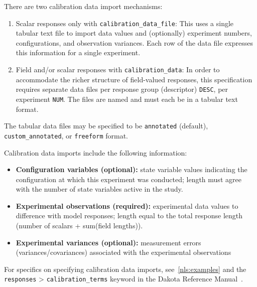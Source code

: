 There are two calibration data import mechanisms:
\begin{enumerate}
\item Scalar responses only with \texttt{calibration\_data\_file}: This
  uses a single tabular text file to import data values and
  (optionally) experiment numbers, configurations, and observation
  variances.  Each row of the data file expresses this information for
  a single experiment.

\item Field and/or scalar responses with \texttt{calibration\_data}:
  In order to accommodate the richer structure of field-valued
  responses, this specification requires separate data files per
  response group (descriptor) {\tt DESC}, per experiment {\tt NUM}.
  The files are named  and must each be in a
  tabular text format.
\end{enumerate}
The tabular data files may be specified to be {\tt annotated}
(default), {\tt custom\_annotated}, or {\tt freeform} format.

Calibration data imports include the following information:
\begin{itemize}
\item {\bf Configuration variables (optional):} state variable values
  indicating the configuration at which this experiment was conducted;
  length must agree with the number of state variables active in the
  study.
\item {\bf Experimental observations (required):} experimental data
  values to difference with model responses; length equal to the total
  response length (number of scalars + sum(field lengths)).
\item {\bf Experimental variances (optional):} measurement errors
  (variances/covariances) associated with the experimental
  observations
\end{itemize}

For specifics on specifying calibration data imports,
see~\ref{nls:examples} and the \texttt{responses} \textgreater 
\texttt{calibration\_terms} keyword in the Dakota Reference
Manual~\cite{RefMan}.

